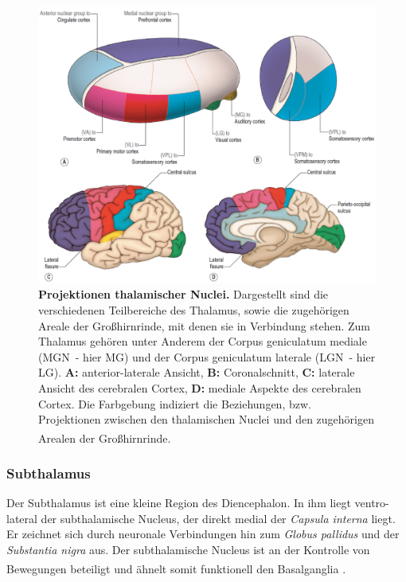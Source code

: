 \documentclass[12pt,a4paper,pdftex]{article}
\begin{document}
\begin{figure}[H]
    \centering
    \includegraphics[width=\textwidth]{pictures/Bilder_Jule/Andere/thalamus.png}
    \caption[Projektionen thalamischer Nuclei]{\textbf{Projektionen thalamischer Nuclei.} Dargestellt sind die verschiedenen Teilbereiche des Thalamus, sowie die zugehörigen Areale der Großhirnrinde, mit denen sie in Verbindung stehen. Zum Thalamus gehören unter Anderem der Corpus geniculatum mediale (MGN~- hier MG) und der Corpus geniculatum laterale (LGN~- hier LG). \textbf{A:} anterior-laterale Ansicht, \textbf{B:} Coronalschnitt, \textbf{C:} laterale Ansicht des cerebralen Cortex, \textbf{D:} mediale Aspekte des cerebralen Cortex. Die Farbgebung indiziert die Beziehungen, bzw. Projektionen zwischen den thalamischen Nuclei und den zugehörigen Arealen der Großhirnrinde. \textsuperscript{\cite[12]{crossman2014neuroanatomy}}}
    \label{fig:thalamus_nuclei}
\end{figure}

\subsubsection{Subthalamus} 

Der Subthalamus ist eine kleine Region des Diencephalon. In ihm liegt ventro-lateral der subthalamische Nucleus, der direkt medial der \textit{Capsula interna} liegt. Er zeichnet sich durch neuronale Verbindungen hin zum \textit{Globus pallidus} und der \textit{Substantia nigra} aus. Der subthalamische Nucleus ist an der Kontrolle von Bewegungen beteiligt \textsuperscript{\cite[12]{crossman2014neuroanatomy}} und ähnelt somit funktionell den Basalganglia \textsuperscript{\cite[16]{crossman2014neuroanatomy}}.
\end{document}

